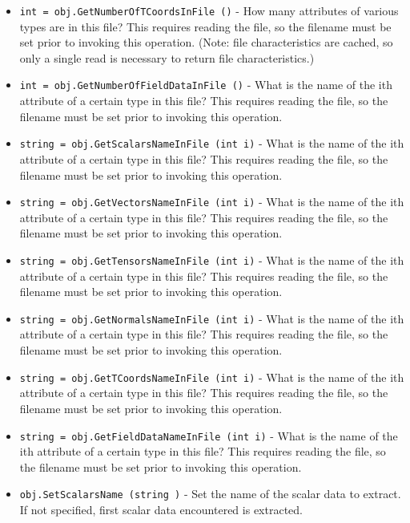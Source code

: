 \begin{itemize}
\item  \verb|int = obj.GetNumberOfTCoordsInFile ()| -  How many attributes of various types are in this file? This 
 requires reading the file, so the filename must be set prior 
 to invoking this operation. (Note: file characteristics are
 cached, so only a single read is necessary to return file
 characteristics.)

\item  \verb|int = obj.GetNumberOfFieldDataInFile ()| -  What is the name of the ith attribute of a certain type
 in this file? This requires reading the file, so the filename 
 must be set prior to invoking this operation.

\item  \verb|string = obj.GetScalarsNameInFile (int i)| -  What is the name of the ith attribute of a certain type
 in this file? This requires reading the file, so the filename 
 must be set prior to invoking this operation.

\item  \verb|string = obj.GetVectorsNameInFile (int i)| -  What is the name of the ith attribute of a certain type
 in this file? This requires reading the file, so the filename 
 must be set prior to invoking this operation.

\item  \verb|string = obj.GetTensorsNameInFile (int i)| -  What is the name of the ith attribute of a certain type
 in this file? This requires reading the file, so the filename 
 must be set prior to invoking this operation.

\item  \verb|string = obj.GetNormalsNameInFile (int i)| -  What is the name of the ith attribute of a certain type
 in this file? This requires reading the file, so the filename 
 must be set prior to invoking this operation.

\item  \verb|string = obj.GetTCoordsNameInFile (int i)| -  What is the name of the ith attribute of a certain type
 in this file? This requires reading the file, so the filename 
 must be set prior to invoking this operation.

\item  \verb|string = obj.GetFieldDataNameInFile (int i)| -  What is the name of the ith attribute of a certain type
 in this file? This requires reading the file, so the filename 
 must be set prior to invoking this operation.

\item  \verb|obj.SetScalarsName (string )| -  Set the name of the scalar data to extract. If not specified, first 
 scalar data encountered is extracted.


\end{itemize}
